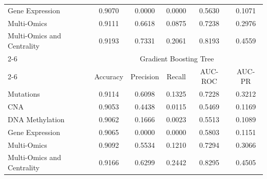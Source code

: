 \documentclass[ppgc, diss, english]{iiufrgs}
\begin{document}
\begin{table}[!th]
\begin{tabular}{lccccc}
Gene Expression            & 0.9070   & 0.0000    & 0.0000 & 0.5630  & 0.1071 \\
Multi-Omics                & 0.9111   & 0.6618    & 0.0875 & 0.7238  & 0.2976 \\
Multi-Omics and Centrality & 0.9193   & 0.7331    & 0.2061 & 0.8193  & 0.4559 \\ \cline{2-6} 
                           & \multicolumn{5}{c}{Gradient Boosting Tree}            \\ \cline{2-6} 
                           & Accuracy & Precision & Recall & AUC-ROC & AUC-PR \\
Mutations                  & 0.9114   & 0.6098    & 0.1325 & 0.7228  & 0.3212 \\
CNA                        & 0.9053   & 0.4438    & 0.0115 & 0.5469  & 0.1169 \\
DNA Methylation            & 0.9062   & 0.1666    & 0.0023 & 0.5513  & 0.1089 \\
Gene Expression            & 0.9065   & 0.0000    & 0.0000 & 0.5803  & 0.1151 \\
Multi-Omics                & 0.9092   & 0.5534    & 0.1210 & 0.7294  & 0.3066 \\
Multi-Omics and Centrality & 0.9166   & 0.6299    & 0.2442 & 0.8295  & 0.4505 \\ \hline
\end{tabular}
\end{table}
\end{document}
